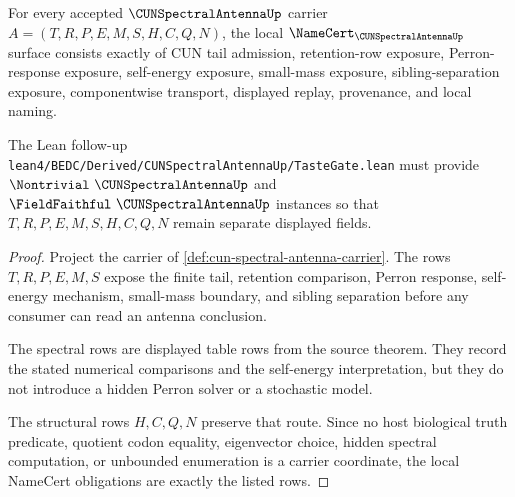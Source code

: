 \begin{theorem}
\label{thm:cun-spectral-antenna-namecert-obligations}
For every accepted $\CUNSpectralAntennaUp$ carrier $A=(T,R,P,E,M,S,H,C,Q,N)$, the local $\NameCert_{\CUNSpectralAntennaUp}$ surface consists exactly of CUN tail admission, retention-row exposure, Perron-response exposure, self-energy exposure, small-mass exposure, sibling-separation exposure, componentwise transport, displayed replay, provenance, and local naming.

The Lean follow-up \texttt{lean4/BEDC/Derived/CUNSpectralAntennaUp/TasteGate.lean} must provide $\Nontrivial\ \CUNSpectralAntennaUp$ and $\FieldFaithful\ \CUNSpectralAntennaUp$ instances so that $T,R,P,E,M,S,H,C,Q,N$ remain separate displayed fields.
\end{theorem}
\begin{proof}
Project the carrier of \autoref{def:cun-spectral-antenna-carrier}. The rows $T,R,P,E,M,S$ expose the finite tail, retention comparison, Perron response, self-energy mechanism, small-mass boundary, and sibling separation before any consumer can read an antenna conclusion.

The spectral rows are displayed table rows from the source theorem. They record the stated numerical comparisons and the self-energy interpretation, but they do not introduce a hidden Perron solver or a stochastic model.

The structural rows $H,C,Q,N$ preserve that route. Since no host biological truth predicate, quotient codon equality, eigenvector choice, hidden spectral computation, or unbounded enumeration is a carrier coordinate, the local NameCert obligations are exactly the listed rows.
\end{proof}

